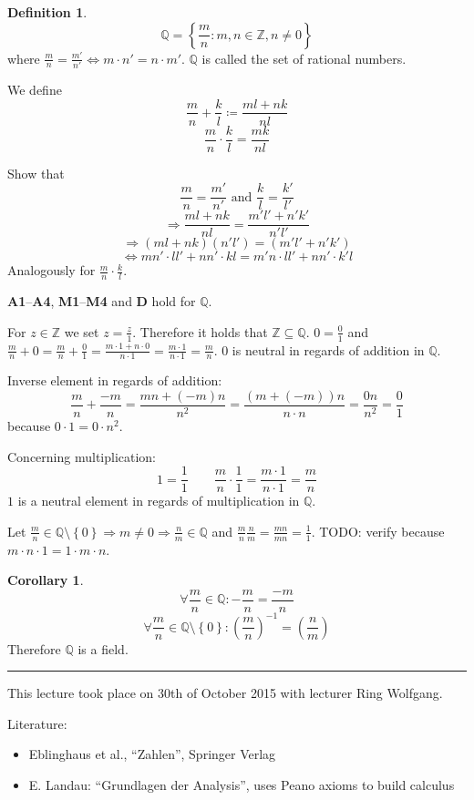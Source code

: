 \documentclass[a4paper,landscape,twocolumn]{article}
\theoremstyle{definition}
\newtheorem{defi}{Definition}
\newtheorem{cor}{Corollary}
\newcommand\set[1]{\left\{#1\right\}}
\newcommand\meta[3]{\hrule{} This #1 took place on #2 with lecturer #3.\par}
\begin{document}
\begin{defi}
  \[ \mathbb{Q} = \set{\frac mn: m,n \in \mathbb{Z}, n \neq 0} \]
  where $\frac mn = \frac{m'}{n'} \Leftrightarrow m \cdot n' = n \cdot m'$.
  $\mathbb{Q}$ is called the set of rational numbers.

  We define
  \[ \frac mn + \frac kl \coloneqq \frac{ml + nk}{nl} \]
  \[ \frac mn \cdot \frac kl = \frac{mk}{nl} \]

  Show that
  \[ \frac mn = \frac{m'}{n'} \text{ and } \frac kl = \frac{k'}{l'} \]
  \[ \Rightarrow \frac{ml + nk}{nl} = \frac{m'l' + n'k'}{n'l'} \]
  \[ \Rightarrow (ml + nk)(n' l') = (m' l' + n' k') \]
  \[ \Leftrightarrow mn' \cdot ll' + nn' \cdot kl = m'n \cdot ll' + nn' \cdot k' l \]
  Analogously for $\frac mn \cdot \frac kl$.

  \textbf{A1}--\textbf{A4}, \textbf{M1}--\textbf{M4} and \textbf{D} hold for $\mathbb{Q}$.

  For $z \in \mathbb{Z}$ we set $z = \frac z1$.
  Therefore it holds that $\mathbb{Z} \subseteq \mathbb{Q}$.
  $0 = \frac 01$ and $\frac mn + 0 = \frac mn + \frac 01 = \frac{m\cdot 1 + n\cdot 0}{n\cdot 1} = \frac{m \cdot 1}{n\cdot 1} = \frac mn$.
  $0$ is neutral in regards of addition in $\mathbb{Q}$.

  Inverse element in regards of addition:
  \[ \frac mn + \frac{-m}n = \frac{mn + (-m)n}{n^2} = \frac{(m + (-m)) n}{n \cdot n} = \frac{0n}{n^2} = \frac 01 \]
  because $0 \cdot 1 = 0 \cdot n^2$.

  Concerning multiplication:
  \[ 1 = \frac 11 \qquad \frac mn \cdot \frac 11 = \frac{m\cdot 1}{n\cdot 1} = \frac mn \]
  $1$ is a neutral element in regards of multiplication in $\mathbb{Q}$.

  Let $\frac mn \in \mathbb{Q} \setminus \set{0} \Rightarrow m \neq 0 \Rightarrow \frac nm \in \mathbb{Q}$ and $\frac mn \frac nm = \frac{mn}{mn} = \frac 11$. TODO: verify
  because $m \cdot n \cdot 1 = 1\cdot m \cdot n$.
\end{defi}

\begin{cor}
  \[ \forall \frac mn \in \mathbb{Q}: -\frac mn = \frac{-m}{n} \]
  \[ \forall \frac mn \in \mathbb{Q} \setminus \set{0}: \left(\frac mn\right)^{-1} = \left(\frac nm\right) \]
  Therefore $\mathbb{Q}$ is a field.
\end{cor}

\meta{lecture}{30th of October 2015}{Ring Wolfgang}

Literature:
\begin{itemize}
  \item Eblinghaus et al., \enquote{Zahlen}, Springer Verlag
  \item E. Landau: \enquote{Grundlagen der Analysis}, uses Peano axioms to build calculus
\end{itemize}
\end{document}
